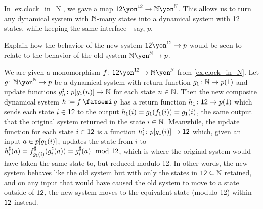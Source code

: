 \documentclass[Book-Poly]{subfiles}
\begin{document}
\begin{exercise}
In \cref{ex.clock_in_N}, we gave a map $\1\2\yon^{\1\2}\to\nn\yon^\nn$. This allows us to turn any dynamical system with $\mathbb{N}$-many states into a dynamical system with 12 states, while keeping the same interface---say, $p$. 

Explain how the behavior of the new system $\1\2\yon^{\1\2}\to p$ would be seen to relate to the behavior of the old system $\nn\yon^\nn\to p$.
\begin{solution}
We are given a monomorphism $f \colon \1\2\yon^{\1\2} \to \nn\yon^\nn$ from \cref{ex.clock_in_N}.
Let $g \colon \nn\yon^\nn \to p$ be a dynamical system with return function $g_{\textsf{1}} \colon \mathbb{N} \to p(\textsf{1})$ and update functions $g^\sharp_n \colon p[g_{\textsf{1}}(n)] \to \mathbb{N}$ for each state $n \in \mathbb{N}$.
Then the new composite dynamical system $h \coloneqq f \then g$ has a return function $h_{\textsf{1}} \colon \textsf{1}\textsf{2} \to p(\textsf{1})$ which sends each state $i \in \textsf{1}\textsf{2}$ to the output $h_{\textsf{1}}(i) = g_{\textsf{1}}(f_{\textsf{1}}(i)) = g_{\textsf{1}}(i)$, the same output that the original system returned in the state $i \in \mathbb{N}$.
Meanwhile, the update function for each state $i \in \textsf{1}\textsf{2}$ is a function $h^\sharp_i \colon p[g_{\textsf{1}}(i)] \to \textsf{1}\textsf{2}$ which, given an input $a \in p[g_{\textsf{1}}(i)]$, updates the state from $i$ to $h^\sharp_i(a) = f^\sharp_{g_{\textsf{1}}(i)}(g^\sharp_i(a)) = g^\sharp_i(a) \mod 12$, which is where the original system would have taken the same state to, but reduced modulo 12.
In other words, the new system behaves like the old system but with only the states in $\textsf{1}\textsf{2} \subseteq \mathbb{N}$ retained, and on any input that would have caused the old system to move to a state outside of $\textsf{1}\textsf{2}$, the new system moves to the equivalent state (modulo 12) within $\textsf{1}\textsf{2}$ instead. 
\end{solution}
\end{exercise}
\end{document}
